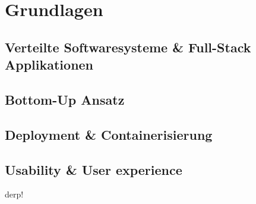 
\section{Grundlagen} \label{sec:grundlagen}

\subsection{Verteilte Softwaresysteme & Full-Stack Applikationen} \label{subsec:vs}




\subsection{Bottom-Up Ansatz} \label{subsec:bottomup}

\subsection{Deployment & Containerisierung} \label{subsec:deployment}

\subsection{Usability & User experience} \label{subsec:usability}



derp!